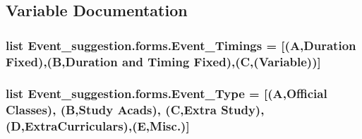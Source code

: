 \subsection{Variable Documentation}
\subsubsection[{\texorpdfstring{Event\+\_\+\+Timings}{Event_Timings}}]{\setlength{\rightskip}{0pt plus 5cm}list Event\+\_\+suggestion.\+forms.\+Event\+\_\+\+Timings = \mbox{[}(\textquotesingle{}A\textquotesingle{},\textquotesingle{}Duration Fixed\textquotesingle{}),(\textquotesingle{}B\textquotesingle{},\textquotesingle{}Duration and Timing Fixed\textquotesingle{}),(\textquotesingle{}C\textquotesingle{},(\textquotesingle{}Variable\textquotesingle{}))\mbox{]}}\hypertarget{namespaceEvent__suggestion_1_1forms_a2800e9ad6984de64ae6ee4ef845b19d1}{}\label{namespaceEvent__suggestion_1_1forms_a2800e9ad6984de64ae6ee4ef845b19d1}
\subsubsection[{\texorpdfstring{Event\+\_\+\+Type}{Event_Type}}]{\setlength{\rightskip}{0pt plus 5cm}list Event\+\_\+suggestion.\+forms.\+Event\+\_\+\+Type = \mbox{[}(\textquotesingle{}A\textquotesingle{},\textquotesingle{}Official Classes\textquotesingle{}), (\textquotesingle{}B\textquotesingle{},\textquotesingle{}Study Acads\textquotesingle{}), (\textquotesingle{}C\textquotesingle{},\textquotesingle{}Extra Study\textquotesingle{}), (\textquotesingle{}D\textquotesingle{},\textquotesingle{}Extra\+Curriculars\textquotesingle{}),(\textquotesingle{}E\textquotesingle{},\textquotesingle{}Misc.\textquotesingle{})\mbox{]}}\hypertarget{namespaceEvent__suggestion_1_1forms_ad2d5d5802c8d2108ad19611c8b0aae4f}{}\label{namespaceEvent__suggestion_1_1forms_ad2d5d5802c8d2108ad19611c8b0aae4f}
